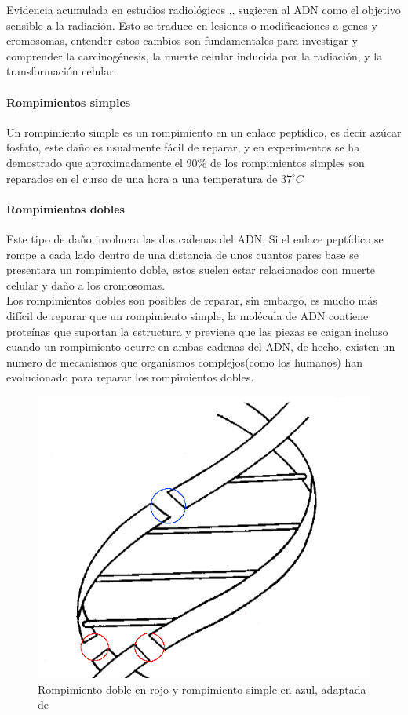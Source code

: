 Evidencia acumulada en estudios radiológicos \cite{Franklin},\cite{rescells},  sugieren al ADN como el  objetivo sensible a la radiación. Esto se traduce en lesiones o modificaciones a genes y cromosomas, entender estos cambios son fundamentales para investigar y comprender la carcinogénesis, la muerte celular inducida por la radiación, y la transformación celular.\\


\paragraph{Rompimientos simples}
Un rompimiento simple es un rompimiento en un enlace peptídico, es decir azúcar fosfato, este daño es usualmente fácil de reparar, y en experimentos  se ha demostrado que aproximadamente el 90\% de los rompimientos simples son reparados en el curso de una hora a una temperatura de $37^{\circ} C$ \cite{Thormod}

\paragraph{Rompimientos dobles}

Este tipo de daño involucra las dos cadenas  del ADN, Si el enlace peptídico se rompe a cada lado dentro de una distancia de unos cuantos pares base se presentara un rompimiento doble, estos suelen estar relacionados con muerte celular y daño a los cromosomas.\\
Los rompimientos dobles son posibles de reparar, sin embargo, es mucho más difícil de reparar que un rompimiento simple,
la molécula de ADN contiene proteínas que suportan la estructura y previene que las piezas se caigan incluso cuando un rompimiento ocurre en ambas cadenas del ADN, de hecho, existen un numero de mecanismos que organismos complejos(como los humanos) han evolucionado para reparar los rompimientos dobles\cite{Thormod}.

\begin{figure}[htbp]
    \centering
    \includegraphics[width=0.5\linewidth]{./Figures/esbdb.png}
    \caption[Esquema rompimientos simples y dobles]{Rompimiento doble en rojo y rompimiento simple en azul, adaptada de \cite{Thormod}}
    \label{fig:esbdb}
\end{figure}


